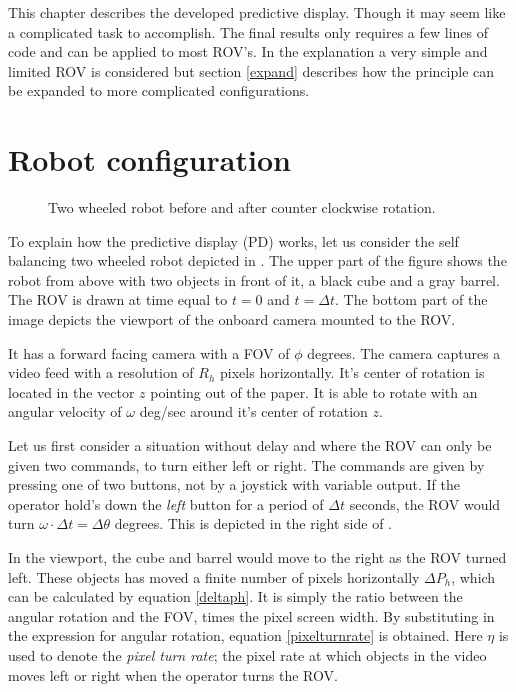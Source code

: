 This chapter describes the developed predictive display. Though it may seem like a complicated task to accomplish. The final results only requires a few lines of code and can be applied to most ROV's. In the explanation a very simple and limited ROV is considered but section \ref{expand} describes how the principle can be expanded to more complicated configurations.

\section{Robot configuration} \label{chp31}
 
\begin{figure}[h!]    
    \centering           
    \def\svgwidth{.8\columnwidth}
    
    \caption{Two wheeled robot before and after counter clockwise rotation.}
    \label{twoWheeled}
\end{figure}

 
To explain how the predictive display (PD) works, let us consider the self balancing two wheeled robot depicted in . The upper part of the figure shows the robot from above with two objects in front of it, a black cube and a gray barrel. The ROV is drawn at time equal to $t=0$ and $t=\Delta t$. The bottom part of the image depicts the viewport of the onboard camera mounted to the ROV.

It has a forward facing camera with a FOV of $\phi$ degrees. The camera captures a video feed with a resolution of $R_h$ pixels horizontally. It's center of rotation is located in the vector $z$ pointing out of the paper. It is able to rotate with an angular velocity of $\omega$ deg/sec around it's center of rotation $z$.

Let us first consider a situation without delay and where the ROV can only be given two commands, to turn either left or right. The commands are given by pressing one of two buttons, not by a joystick with variable output. If the operator hold's down the \emph{left} button for a period of $\Delta t$ seconds, the ROV would turn $\omega \cdot \Delta t = \Delta \theta$ degrees. This is depicted in the right side of .

In the viewport, the cube and barrel would move to the right as the ROV turned left. These objects has moved a finite number of pixels horizontally $\Delta P_h$, which can be calculated by equation \ref{deltaph}. It is simply the ratio between the angular rotation and the FOV, times the pixel screen width. By substituting in the expression for angular rotation, equation \ref{pixelturnrate} is obtained. Here $\eta$ is used to denote the \textit{pixel turn rate}; the pixel rate at which objects in the video moves left or right when the operator turns the ROV.


